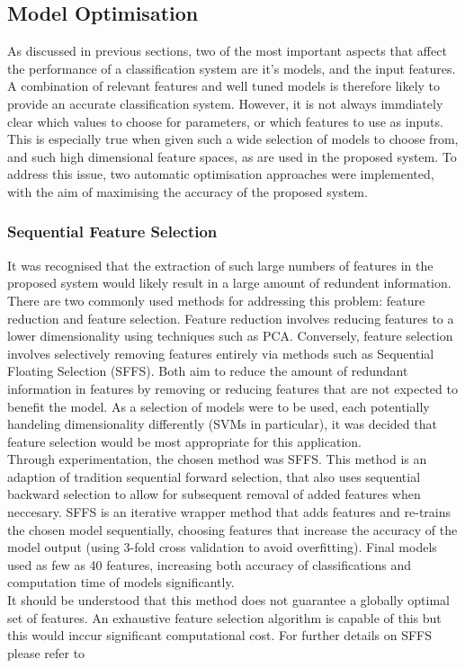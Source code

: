 \documentclass[titlepage, 12pt]{scrartcl} \usepackage{enumitem}
\begin{document}

\subsection{Model Optimisation}\label{optimise}
As discussed in previous sections, two of the most important aspects that affect
the performance of a classification system are it's models, and the input
features. A combination of relevant features and well tuned models is therefore
likely to provide an accurate classification system. However, it is not always
immdiately clear which values to choose for parameters, or which features to use as
inputs. This is especially true when given such a wide selection of models to
choose from, and such high dimensional feature spaces, as are used in the
proposed system. To address this issue, two automatic optimisation approaches
were implemented, with the aim of maximising the accuracy of the proposed
system. 

\subsubsection{Sequential Feature Selection}\label{SFS}
It was recognised that the extraction of such large numbers of features in the
proposed system would likely result in a large amount of redundent information.
There are two commonly used methods for addressing this problem: feature
reduction and feature selection. Feature reduction involves reducing features
to a lower dimensionality using techniques such as PCA. Conversely, feature
selection involves selectively removing features entirely via methods such as
Sequential Floating Selection (SFFS). Both aim to reduce the amount of
redundant information in features by removing or reducing features that are not
expected to benefit the model. As a selection of models were to be used, each
potentially handeling dimensionality differently (SVMs in particular), it was
decided that feature selection would be most appropriate for this
application.\\

Through experimentation, the chosen method was SFFS. This method is an adaption
of tradition sequential forward selection, that also uses sequential backward
selection to allow for subsequent removal of added features when neccesary.
SFFS is an iterative wrapper method that adds features and re-trains the chosen
model sequentially, choosing features that increase the accuracy of the model
output (using 3-fold cross validation to avoid overfitting). Final models used
as few as 40 features, increasing both accuracy of classifications and
computation time of models significantly.\\
It should be understood that this method does not guarantee a globally optimal
set of features. An exhaustive feature selection algorithm is capable of this
but this would inccur significant computational cost. For further details on
SFFS please refer to~\parencite[p.3]{Ferri1994}
\end{document}
